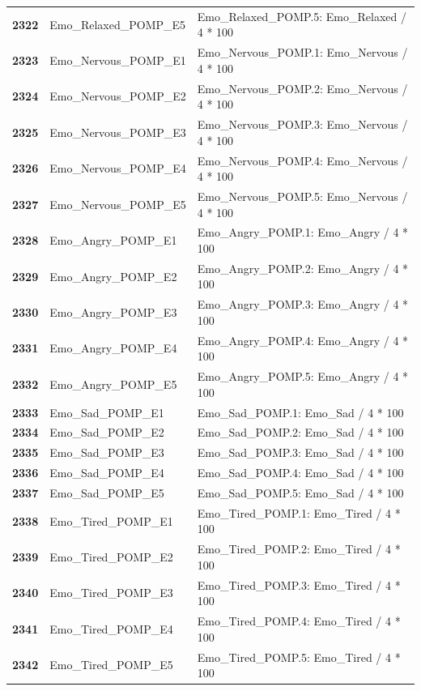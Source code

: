 \documentclass[
  letterpaper,
  DIV=11,
  numbers=noendperiod]{scrartcl}
\begin{document}
\begin{longtable}[t]{>{}cll}
\textbf{2322} & Emo\_Relaxed\_POMP\_E5 & Emo\_Relaxed\_POMP.5: Emo\_Relaxed / 4 * 100\\
\textbf{2323} & Emo\_Nervous\_POMP\_E1 & Emo\_Nervous\_POMP.1: Emo\_Nervous / 4 * 100\\
\textbf{2324} & Emo\_Nervous\_POMP\_E2 & Emo\_Nervous\_POMP.2: Emo\_Nervous / 4 * 100\\
\textbf{2325} & Emo\_Nervous\_POMP\_E3 & Emo\_Nervous\_POMP.3: Emo\_Nervous / 4 * 100\\
\addlinespace
\textbf{2326} & Emo\_Nervous\_POMP\_E4 & Emo\_Nervous\_POMP.4: Emo\_Nervous / 4 * 100\\
\textbf{2327} & Emo\_Nervous\_POMP\_E5 & Emo\_Nervous\_POMP.5: Emo\_Nervous / 4 * 100\\
\textbf{2328} & Emo\_Angry\_POMP\_E1 & Emo\_Angry\_POMP.1: Emo\_Angry / 4 * 100\\
\textbf{2329} & Emo\_Angry\_POMP\_E2 & Emo\_Angry\_POMP.2: Emo\_Angry / 4 * 100\\
\textbf{2330} & Emo\_Angry\_POMP\_E3 & Emo\_Angry\_POMP.3: Emo\_Angry / 4 * 100\\
\addlinespace
\textbf{2331} & Emo\_Angry\_POMP\_E4 & Emo\_Angry\_POMP.4: Emo\_Angry / 4 * 100\\
\textbf{2332} & Emo\_Angry\_POMP\_E5 & Emo\_Angry\_POMP.5: Emo\_Angry / 4 * 100\\
\textbf{2333} & Emo\_Sad\_POMP\_E1 & Emo\_Sad\_POMP.1: Emo\_Sad / 4 * 100\\
\textbf{2334} & Emo\_Sad\_POMP\_E2 & Emo\_Sad\_POMP.2: Emo\_Sad / 4 * 100\\
\textbf{2335} & Emo\_Sad\_POMP\_E3 & Emo\_Sad\_POMP.3: Emo\_Sad / 4 * 100\\
\addlinespace
\textbf{2336} & Emo\_Sad\_POMP\_E4 & Emo\_Sad\_POMP.4: Emo\_Sad / 4 * 100\\
\textbf{2337} & Emo\_Sad\_POMP\_E5 & Emo\_Sad\_POMP.5: Emo\_Sad / 4 * 100\\
\textbf{2338} & Emo\_Tired\_POMP\_E1 & Emo\_Tired\_POMP.1: Emo\_Tired / 4 * 100\\
\textbf{2339} & Emo\_Tired\_POMP\_E2 & Emo\_Tired\_POMP.2: Emo\_Tired / 4 * 100\\
\textbf{2340} & Emo\_Tired\_POMP\_E3 & Emo\_Tired\_POMP.3: Emo\_Tired / 4 * 100\\
\addlinespace
\textbf{2341} & Emo\_Tired\_POMP\_E4 & Emo\_Tired\_POMP.4: Emo\_Tired / 4 * 100\\
\textbf{2342} & Emo\_Tired\_POMP\_E5 & Emo\_Tired\_POMP.5: Emo\_Tired / 4 * 100\\

\end{longtable}
\end{document}
